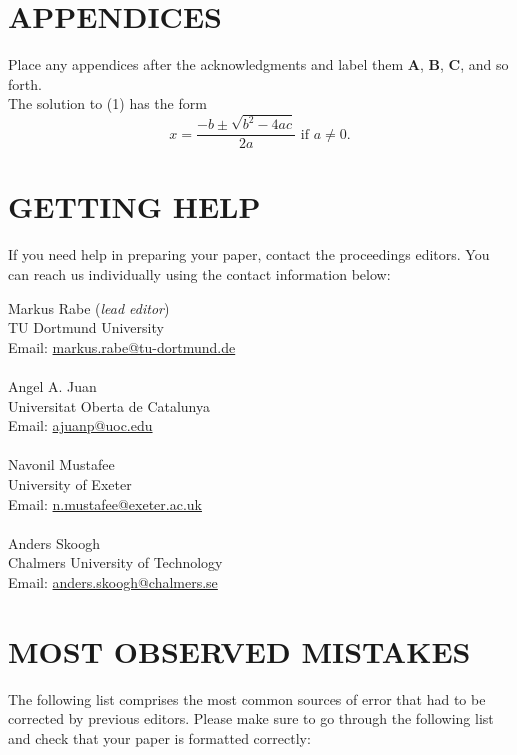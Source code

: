 \documentclass{wscpaperproc}
\theoremstyle{wsc}
\begin{document}
\appendix

\section{APPENDICES} \label{app:quadratic}
Place any appendices after the acknowledgments and label them
\textbf{A}, \textbf{B}, \textbf{C}, and so forth.\\

The solution to (1) has the form
\begin{equation} \label{eq: quadratic sol}
x = \frac{-b \pm \sqrt{b^2-4ac}}{2a} \mbox{ if } a \ne 0.
\end{equation}


\section{GETTING HELP}
If you need help in preparing your paper, contact the proceedings editors. You can reach us individually using the contact information below:

\vspace{6pt}

\noindent Markus Rabe (\textit{lead editor})\\
TU Dortmund University\\
Email: \href{mailto:markus.rabe@tu-dortmund.de}{markus.rabe@tu-dortmund.de}\\
\\
Angel A. Juan\\
Universitat Oberta de Catalunya\\
Email: \href{mailto:ajuanp@uoc.edu}{ajuanp@uoc.edu}\\
\\
Navonil Mustafee\\
University of Exeter\\
Email: \href{mailto:n.mustafee@exeter.ac.uk}{n.mustafee@exeter.ac.uk}\\
\\
Anders Skoogh\\
Chalmers University of Technology\\
Email: \href{mailto:anders.skoogh@chalmers.se}{anders.skoogh@chalmers.se}

\section{MOST OBSERVED MISTAKES}

The following list comprises the most common sources of error that had to be corrected by previous editors. Please make sure to go through the following list and check that your paper is formatted correctly:
\end{document}
